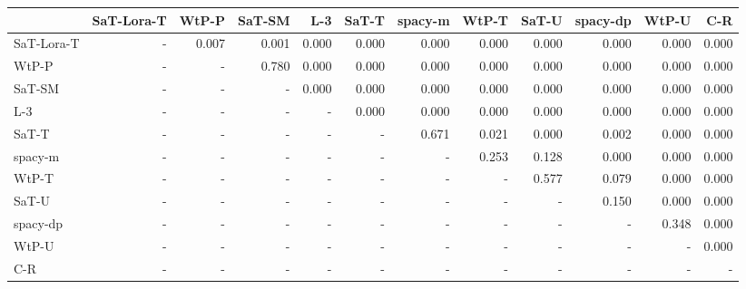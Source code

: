 \begin{tabular}{lrrrrrrrrrrr}
\toprule
 & SaT-Lora-T & WtP-P & SaT-SM & L-3 & SaT-T & spacy-m & WtP-T & SaT-U & spacy-dp & WtP-U & C-R \\
\midrule
SaT-Lora-T & - & 0.007 & 0.001 & 0.000 & 0.000 & 0.000 & 0.000 & 0.000 & 0.000 & 0.000 & 0.000 \\
WtP-P & - & - & 0.780 & 0.000 & 0.000 & 0.000 & 0.000 & 0.000 & 0.000 & 0.000 & 0.000 \\
SaT-SM & - & - & - & 0.000 & 0.000 & 0.000 & 0.000 & 0.000 & 0.000 & 0.000 & 0.000 \\
L-3 & - & - & - & - & 0.000 & 0.000 & 0.000 & 0.000 & 0.000 & 0.000 & 0.000 \\
SaT-T & - & - & - & - & - & 0.671 & 0.021 & 0.000 & 0.002 & 0.000 & 0.000 \\
spacy-m & - & - & - & - & - & - & 0.253 & 0.128 & 0.000 & 0.000 & 0.000 \\
WtP-T & - & - & - & - & - & - & - & 0.577 & 0.079 & 0.000 & 0.000 \\
SaT-U & - & - & - & - & - & - & - & - & 0.150 & 0.000 & 0.000 \\
spacy-dp & - & - & - & - & - & - & - & - & - & 0.348 & 0.000 \\
WtP-U & - & - & - & - & - & - & - & - & - & - & 0.000 \\
C-R & - & - & - & - & - & - & - & - & - & - & - \\
\bottomrule
\end{tabular}

